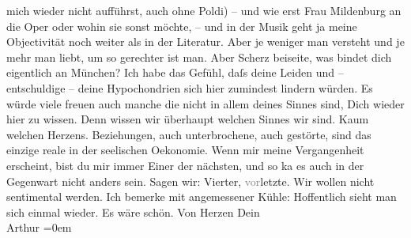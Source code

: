 \begin{ledgroupsized}[t]{13cm}
               mich wieder nicht aufführst, auch ohne Poldi)
               – und wie erst Frau Mildenburg an die Oper oder wohin sie sonst möchte, – und in der
               Musik geht ja meine Objectivität noch weiter als in der Literatur. Aber je weniger
               man versteht und je mehr man liebt, um so gerechter ist man.\pend
           \pstart
           Aber Scherz beiseite, was bindet dich eigentlich an München? Ich habe das Gefühl, daſs deine Leiden und – entschuldige – deine
               Hypochondrien sich hier zumindest lindern würden. Es würde viele freuen auch manche
               die nicht in allem deines Sinnes sind, Dich wieder hier zu wissen. Denn wissen wir
               überhaupt {\pb}welchen
               Sinnes wir sind. Kaum welchen Herzens. Beziehungen, auch unterbrochene, auch
               gestörte, sind das einzige reale in der seelischen Oekonomie. \label{LL141-1v}\label{LL141-1h}Wenn mir meine Vergangenheit erscheint, bist du mir immer Einer
               der nächsten, und so ka{\geminationn} es auch in der Gegenwart nicht
               anders sein. \pend
           \pstart
           \label{K_L02533-2v}\label{K_L02533-2h} Sagen wir: Vierter, \textcolor{gray}{vor}letzte. Wir wollen nicht
               sentimental \introOben{}werden.\introOben{} Ich bemerke mit angemessener Kühle:
               Hoffentlich sieht man sich einmal wieder. Es wäre schön.\pend
           \pstart
           Von Herzen Dein{\\[\baselineskip]}\spacefill\mbox{Arthur}\pend
           \leftskip=0em{}
         
         \endnumbering{}\end{ledgroupsized}  \newcommand{\dateiname}{L02533}\newcommand{\titel}{Arthur Schnitzler an Hermann Bahr, 17. 3. 1930}\newcommand{\editorInnen}{ Kurt Ifkovits,  Martin Anton Müller}
      